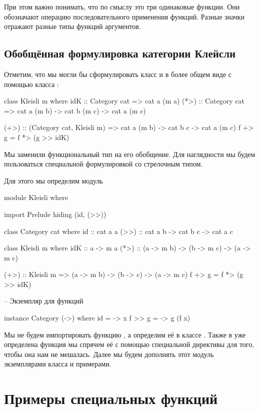 При этом важно понимать, что по смыслу это три одинаковые
функции. Они обозначают операцию последовательного 
применения функций. Разные значки отражают разные типы 
функций аргументов.


\subsection{Обобщённая формулировка категории Клейсли}

Отметим, что мы могли бы сформулировать класс 
и в более общем виде с помощью класса :

\begin{code}
class Kleisli m where
    idK  :: Category cat => cat a (m a)
    (*>) :: Category cat => cat a (m b) -> cat b (m c) -> cat a (m c)

(+>) :: (Category cat, Kleisli m) 
    => cat a (m b) -> cat b c -> cat a (m c)
f +> g = f *> (g >> idK)
\end{code}

Мы заменили функциональный тип на его обобщение. Для наглядности
мы будем пользоваться специальной формулировкой со стрелочным типом. 

Для этого мы определим модуль 


\begin{code}
module Kleisli where

import Prelude hiding (id, (>>))

class Category cat where
    id   :: cat a a
    (>>) :: cat a b -> cat b c -> cat a c

class Kleisli m where
    idK  :: a -> m a
    (*>) :: (a -> m b) -> (b -> m c) -> (a -> m c)    

(+>) :: Kleisli m => (a -> m b) -> (b -> c) -> (a -> m c)
f +> g = f *> (g >> idK)

-- Экземпляр для функций

instance Category (->) where
    id      = \x -> x
    f >> g  = \x -> g (f x)
\end{code}


Мы не будем импортировать функцию , а определим её в классе 
. Также в  уже определена функция 
\In{(>>)} мы спрячем её с помощью специальной директивы 
 
для того, чтобы она нам не мешалась.
Далее мы будем дополнять этот модуль экземплярами класса 
и примерами.

\section{Примеры специальных функций}

